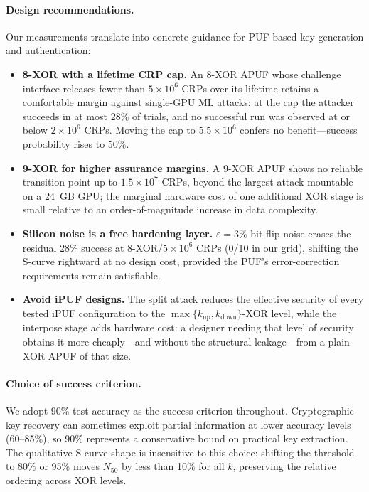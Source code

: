 \paragraph{Design recommendations.}
Our measurements translate into concrete guidance for PUF-based key
generation and authentication:
\begin{itemize}
    \item \textbf{8-XOR with a lifetime CRP cap.}  An 8-XOR APUF whose
    challenge interface releases fewer than $5\times10^6$ CRPs over its
    lifetime retains a comfortable margin against single-GPU ML attacks:
    at the cap the attacker succeeds in at most 28\% of trials, and no
    successful run was observed at or below $2\times10^6$ CRPs.  Moving the
    cap to $5.5\times10^6$ confers no benefit---success probability rises to 50\%.
    \item \textbf{9-XOR for higher assurance margins.}  A 9-XOR APUF shows
    no reliable transition point up to $1.5\times10^7$ CRPs, beyond the
    largest attack mountable on a 24~GB GPU; the marginal hardware cost of
    one additional XOR stage is small relative to an order-of-magnitude
    increase in data complexity.
    \item \textbf{Silicon noise is a free hardening layer.}
    $\varepsilon = 3\%$ bit-flip noise erases the residual 28\% success at
    8-XOR/$5\times10^6$ CRPs (0/10 in our grid), shifting the S-curve
    rightward at no design cost, provided the PUF's error-correction
    requirements remain satisfiable.
    \item \textbf{Avoid iPUF designs.}  The split attack reduces the
    effective security of every tested iPUF configuration to the
    $\max\{k_{\text{up}},k_{\text{down}}\}$-XOR level, while the interpose
    stage adds hardware cost: a designer needing that level of security
    obtains it more cheaply---and without the structural leakage---from a
    plain XOR APUF of that size.
\end{itemize}

\paragraph{Choice of success criterion.}
We adopt 90\% test accuracy as the success criterion throughout.
Cryptographic key recovery can sometimes exploit partial information at lower
accuracy levels (60--85\%), so 90\% represents a conservative bound on
practical key extraction.  The qualitative S-curve shape is insensitive to
this choice: shifting the threshold to 80\% or 95\% moves $N_{50}$ by less
than 10\% for all $k$, preserving the relative ordering across XOR levels.

